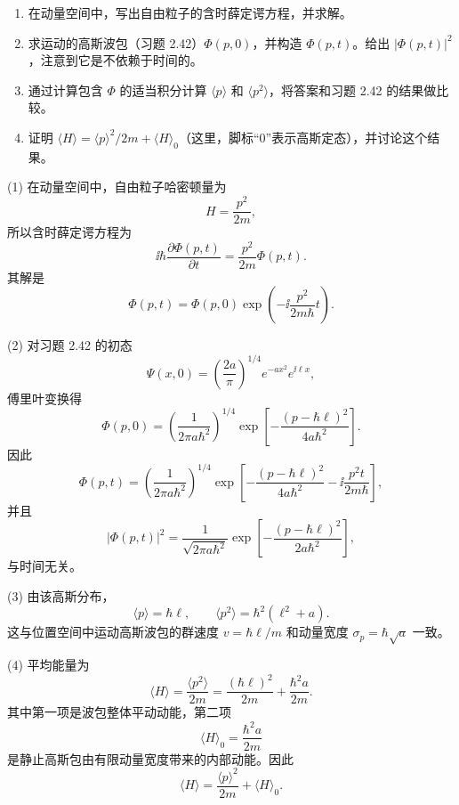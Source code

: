 \begin{question}
\begin{enumerate}
\item 在动量空间中，写出自由粒子的含时薛定谔方程，并求解。
\item 求运动的高斯波包（习题 2.42）$\Phi(p,0)$，并构造 $\Phi(p,t)$。给出 $|\Phi(p,t)|^2$，注意到它是不依赖于时间的。
\item 通过计算包含 $\Phi$ 的适当积分计算 $\langle p\rangle$ 和 $\langle p^2\rangle$，将答案和习题 2.42 的结果做比较。
\item 证明 $\langle H\rangle=\langle p\rangle^2/2m+\langle H\rangle_0$（这里，脚标“0”表示高斯定态），并讨论这个结果。
\end{enumerate}
\end{question}
\begin{solution}
(1) 在动量空间中，自由粒子哈密顿量为
\[
H=\frac{p^2}{2m},
\]
所以含时薛定谔方程为
\[
\ii\hbar\frac{\partial\Phi(p,t)}{\partial t}=\frac{p^2}{2m}\Phi(p,t).
\]
其解是
\[
\boxed{\Phi(p,t)=\Phi(p,0)\exp\left(-\ii\frac{p^2}{2m\hbar}t\right).}
\]

(2) 对习题 2.42 的初态
\[
\Psi(x,0)=\left(\frac{2a}{\pi}\right)^{1/4}e^{-ax^2}e^{\ii\ell x},
\]
傅里叶变换得
\[
\boxed{\Phi(p,0)=\left(\frac1{2\pi a\hbar^2}\right)^{1/4}
\exp\left[-\frac{(p-\hbar\ell)^2}{4a\hbar^2}\right].}
\]
因此
\[
\Phi(p,t)=\left(\frac1{2\pi a\hbar^2}\right)^{1/4}
\exp\left[-\frac{(p-\hbar\ell)^2}{4a\hbar^2}
-\ii\frac{p^2t}{2m\hbar}\right],
\]
并且
\[
|\Phi(p,t)|^2=\frac1{\sqrt{2\pi a\hbar^2}}
\exp\left[-\frac{(p-\hbar\ell)^2}{2a\hbar^2}\right],
\]
与时间无关。

(3) 由该高斯分布，
\[
\boxed{\langle p\rangle=\hbar\ell,}
\qquad
\boxed{\langle p^2\rangle=\hbar^2(\ell^2+a).}
\]
这与位置空间中运动高斯波包的群速度 $v=\hbar\ell/m$ 和动量宽度 $\sigma_p=\hbar\sqrt a$ 一致。

(4) 平均能量为
\[
\langle H\rangle=\frac{\langle p^2\rangle}{2m}
=\frac{(\hbar\ell)^2}{2m}+\frac{\hbar^2a}{2m}.
\]
其中第一项是波包整体平动动能，第二项
\[
\boxed{\langle H\rangle_0=\frac{\hbar^2a}{2m}}
\]
是静止高斯包由有限动量宽度带来的内部动能。因此
\[
\boxed{\langle H\rangle=\frac{\langle p\rangle^2}{2m}+\langle H\rangle_0.}
\]
\end{solution}
